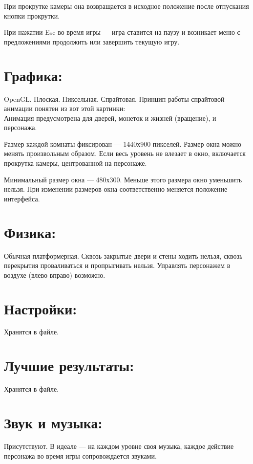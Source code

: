 \documentclass[12pt,a4paper,fullpage]{article}
\begin{document}
При прокрутке камеры она возвращается в исходное положение после отпускания кнопки прокрутки.

При нажатии Esc во время игры --- игра ставится на паузу и возникает меню с предложениями продолжить или завершить текущую игру.\\

\section{Графика:}
OpenGL. Плоская. Пиксельная. Спрайтовая. Принцип работы спрайтовой анимации понятен из вот этой картинки:\\
Анимация предусмотрена для дверей, монеток и жизней (вращение), и персонажа.

Размер каждой комнаты фиксирован --- 1440х900 пикселей. Размер окна можно менять произвольным образом. Если весь уровень не влезает в окно, включается прокрутка камеры, центрованной на персонаже.

Минимальный размер окна --- 480х300. Меньше этого размера окно уменьшить нельзя. При изменении размеров окна соответственно меняется положение интерфейса.\\

\section{Физика:}
Обычная платформерная. Сквозь закрытые двери и стены ходить нельзя, сквозь перекрытия проваливаться и пропрыгивать нельзя. Управлять персонажем в воздухе (влево-вправо) возможно.\\

\section{Настройки:}
Хранятся в файле.\\

\section{Лучшие результаты:}
Хранятся в файле.\\

\section{Звук и музыка:}
Присутствуют. В идеале --- на каждом уровне своя музыка, каждое действие персонажа во время игры сопровождается звуками.
\end{document}
